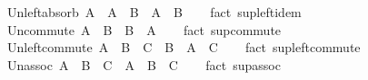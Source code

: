 \begin{isabellebody}
\isanewline
{}\isamarkupfalse%
\ Un{\isacharunderscore}{\kern0pt}left{\isacharunderscore}{\kern0pt}absorb{\isacharcolon}{\kern0pt}\ {\isachardoublequoteopen}A\ {\isasymunion}\ {\isacharparenleft}{\kern0pt}A\ {\isasymunion}\ B{\isacharparenright}{\kern0pt}\ {\isacharequal}{\kern0pt}\ A\ {\isasymunion}\ B{\isachardoublequoteclose}\isanewline
%
\isadelimproof
\ \ %
\endisadelimproof
%
\isatagproof
{}\isamarkupfalse%
\ {\isacharparenleft}{\kern0pt}fact\ sup{\isacharunderscore}{\kern0pt}left{\isacharunderscore}{\kern0pt}idem{\isacharparenright}{\kern0pt}%
\endisatagproof
{\isafoldproof}%
%
\isadelimproof
\isanewline
%
\endisadelimproof
\isanewline
{}\isamarkupfalse%
\ Un{\isacharunderscore}{\kern0pt}commute{\isacharcolon}{\kern0pt}\ {\isachardoublequoteopen}A\ {\isasymunion}\ B\ {\isacharequal}{\kern0pt}\ B\ {\isasymunion}\ A{\isachardoublequoteclose}\isanewline
%
\isadelimproof
\ \ %
\endisadelimproof
%
\isatagproof
{}\isamarkupfalse%
\ {\isacharparenleft}{\kern0pt}fact\ sup{\isacharunderscore}{\kern0pt}commute{\isacharparenright}{\kern0pt}%
\endisatagproof
{\isafoldproof}%
%
\isadelimproof
\isanewline
%
\endisadelimproof
\isanewline
{}\isamarkupfalse%
\ Un{\isacharunderscore}{\kern0pt}left{\isacharunderscore}{\kern0pt}commute{\isacharcolon}{\kern0pt}\ {\isachardoublequoteopen}A\ {\isasymunion}\ {\isacharparenleft}{\kern0pt}B\ {\isasymunion}\ C{\isacharparenright}{\kern0pt}\ {\isacharequal}{\kern0pt}\ B\ {\isasymunion}\ {\isacharparenleft}{\kern0pt}A\ {\isasymunion}\ C{\isacharparenright}{\kern0pt}{\isachardoublequoteclose}\isanewline
%
\isadelimproof
\ \ %
\endisadelimproof
%
\isatagproof
{}\isamarkupfalse%
\ {\isacharparenleft}{\kern0pt}fact\ sup{\isacharunderscore}{\kern0pt}left{\isacharunderscore}{\kern0pt}commute{\isacharparenright}{\kern0pt}%
\endisatagproof
{\isafoldproof}%
%
\isadelimproof
\isanewline
%
\endisadelimproof
\isanewline
{}\isamarkupfalse%
\ Un{\isacharunderscore}{\kern0pt}assoc{\isacharcolon}{\kern0pt}\ {\isachardoublequoteopen}{\isacharparenleft}{\kern0pt}A\ {\isasymunion}\ B{\isacharparenright}{\kern0pt}\ {\isasymunion}\ C\ {\isacharequal}{\kern0pt}\ A\ {\isasymunion}\ {\isacharparenleft}{\kern0pt}B\ {\isasymunion}\ C{\isacharparenright}{\kern0pt}{\isachardoublequoteclose}\isanewline
%
\isadelimproof
\ \ %
\endisadelimproof
%
\isatagproof
{}\isamarkupfalse%
\ {\isacharparenleft}{\kern0pt}fact\ sup{\isacharunderscore}{\kern0pt}assoc{\isacharparenright}{\kern0pt}%
\endisatagproof
{\isafoldproof}%
%
\isadelimproof
\isanewline

\end{isabellebody}
